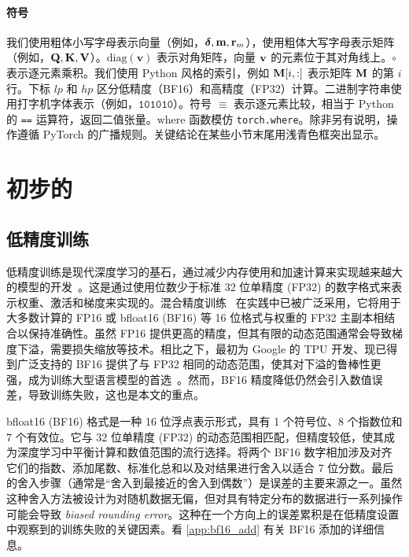 \documentclass{article} %
\begin{document}
\paragraph{符号} 我们使用粗体小写字母表示向量（例如，${\boldsymbol{\delta}}, {\mathbf{m}}, {\mathbf{r}}_m$），使用粗体大写字母表示矩阵（例如，${\mathbf{Q}}, {\mathbf{K}}, {\mathbf{V}}$）。$\mathrm{diag}(\mathbf{v})$ 表示对角矩阵，向量 ${\mathbf{v}}$ 的元素位于其对角线上。$\circ$ 表示逐元素乘积。我们使用 Python 风格的索引，例如 ${\mathbf{M}}[i, :]$ 表示矩阵 ${\mathbf{M}}$ 的第 $i$ 行。下标 $lp$ 和 $hp$ 区分低精度（BF16）和高精度（FP32）计算。二进制字符串使用打字机字体表示（例如，$\mathtt{101010}$）。符号 $\equiv$ 表示逐元素比较，相当于 Python 的 \texttt{==} 运算符，返回二值张量。$\mathrm{where}$ 函数模仿 \texttt{torch.where}。除非另有说明，操作遵循 PyTorch 的广播规则。关键结论在某些小节末尾用\colorbox{cyan!5!white}{浅青色框}突出显示。


\section{初步的}


\subsection{低精度训练}

低精度训练是现代深度学习的基石，通过减少内存使用和加速计算来实现越来越大的模型的开发~\citep{liu2024deepseek,tseng2025training,hao2025low}。这是通过使用位数少于标准 32 位单精度 (FP32) 的数字格式来表示权重、激活和梯度来实现的。混合精度训练~\citep{micikevicius2017mixed} 在实践中已被广泛采用，它将用于大多数计算的 FP16 或 bfloat16 (BF16) 等 16 位格式与权重的 FP32 主副本相结合以保持准确性。虽然 FP16 提供更高的精度，但其有限的动态范围通常会导致梯度下溢，需要损失缩放等技术。相比之下，最初为 Google 的 TPU 开发、现已得到广泛支持的 BF16 提供了与 FP32 相同的动态范围，使其对下溢的鲁棒性更强，成为训练大型语言模型的首选~\citep{kalamkar2019study, wang2019bfloat16}。然而，BF16 精度降低仍然会引入数值误差，导致训练失败，这也是本文的重点。

bfloat16 (BF16) 格式是一种 16 位浮点表示形式，具有 1 个符号位、8 个指数位和 7 个有效位。它与 32 位单精度 (FP32) 的动态范围相匹配，但精度较低，使其成为深度学习中平衡计算和数值范围的流行选择。将两个 BF16 数字相加涉及对齐它们的指数、添加尾数、标准化总和以及对结果进行舍入以适合 7 位分数。最后的舍入步骤（通常是“舍入到最接近的舍入到偶数”）是误差的主要来源之一。虽然这种舍入方法被设计为对随机数据无偏，但对具有特定分布的数据进行一系列操作可能会导致 \emph{biased rounding error}。这种在一个方向上的误差累积是在低精度设置中观察到的训练失败的关键因素。看 \cref{app:bf16_add} 有关 BF16 添加的详细信息。
\end{document}

